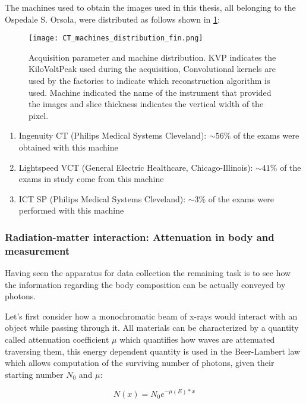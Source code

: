 The machines used to obtain the images used in this thesis, all belonging to the Ospedale S. Orsola, were distributed as follows shown in \ref{fig:ct_dist}:


\begin{figure}[H]
\centering
  		\texttt{[image: CT\_machines\_distribution\_fin.png]}
        \caption{Acquisition parameter and machine distribution. KVP indicates the KiloVoltPeak used during the acquisition, Convolutional kernels are used by the factories to indicate which reconstruction algorithm is used. Machine indicated the name of the instrument that provided the images and slice thickness indicates the vertical width of the pixel.\label{fig:ct_dist}}
\end{figure}

\begin{enumerate}
\item Ingenuity CT  (Philips Medical Systems Cleveland):  $\sim 56\%$ of the exams were obtained with this machine
\item Lightspeed VCT  (General Electric Healthcare, Chicago-Illinois): $\sim 41\%$ of the exams in study come from this machine
\item ICT SP (Philips Medical Systems Cleveland):  $\sim 3\%$ of the exams were performed with this machine
\end{enumerate}

\subsubsection{Radiation-matter interaction: Attenuation in body and measurement}
Having seen the apparatus for data collection the remaining task is to see how the information regarding the body composition can be actually conveyed by photons.

Let's first consider how a monochromatic beam of x-rays would interact with an object while passing through it. All materials can be characterized by a quantity called attenuation coefficient $\mu$ which quantifies how waves are attenuated traversing them, this energy dependent quantity is used in the Beer-Lambert law which allows computation of the surviving number of photons, given their starting number $N_0$ and $\mu$:

\begin{equation}
N(x) = N_0e^{-\mu(E)*x}
\label{Beer-Lambert}
\end{equation}


